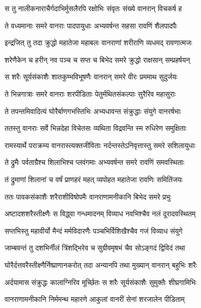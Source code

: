 \twolineshloka
{स तु नालीकनाराचैर्गदाभिर्मुसलैरपि}
{रक्षोभिः संवृतः संख्ये वानरान् विचकर्ष ह} %

\twolineshloka
{ते वध्यमानाः समरे वानराः पादपायुधाः}
{अभ्यवर्षन्त सहसा रावणिं शैलपादपैः} %

\twolineshloka
{इन्द्रजित् तु तदा क्रुद्धो महातेजा महाबलः}
{वानराणां शरीराणि व्यधमद् रावणात्मजः} %

\twolineshloka
{शरेणैकेन च हरीन् नव पञ्च च सप्त च}
{बिभेद समरे क्रुद्धो राक्षसान् सम्प्रहर्षयन्} %

\twolineshloka
{स शरैः सूर्यसंकाशैः शातकुम्भविभूषणैः}
{वानरान् समरे वीरः प्रममाथ सुदुर्जयः} %

\twolineshloka
{ते भिन्नगात्राः समरे वानराः शरपीडिताः}
{पेतुर्मथितसंकल्पाः सुरैरिव महासुराः} %

\twolineshloka
{ते तपन्तमिवादित्यं घोरैर्बाणगभस्तिभिः}
{अभ्यधावन्त संक्रुद्धाः संयुगे वानरर्षभाः} %

\twolineshloka
{ततस्तु वानराः सर्वे भिन्नदेहा विचेतसः}
{व्यथिता विद्रवन्ति स्म रुधिरेण समुक्षिताः} %

\twolineshloka
{रामस्यार्थे पराक्रम्य वानरास्त्यक्तजीविताः}
{नर्दन्तस्तेऽनिवृत्तास्तु समरे सशिलायुधाः} %

\twolineshloka
{ते द्रुमैः पर्वताग्रैश्च शिलाभिश्च प्लवंगमाः}
{अभ्यवर्षन्त समरे रावणिं समवस्थिताः} %

\twolineshloka
{तं द्रुमाणां शिलानां च वर्षं प्राणहरं महत्}
{व्यपोहत महातेजा रावणिः समितिंजयः} %

\twolineshloka
{ततः पावकसंकाशैः शरैराशीविषोपमैः}
{वानराणामनीकानि बिभेद समरे प्रभुः} %

\twolineshloka
{अष्टादशशरैस्तीक्ष्णैः स विद्ध्वा गन्धमादनम्}
{विव्याध नवभिश्चैव नलं दूरादवस्थितम्} %

\twolineshloka
{सप्तभिस्तु महावीर्यो मैन्दं मर्मविदारणैः}
{पञ्चभिर्विशिखैश्चैव गजं विव्याध संयुगे} %

\twolineshloka
{जाम्बवन्तं तु दशभिर्नीलं त्रिंशद्भिरेव च}
{सुग्रीवमृषभं चैव सोऽङ्गदं द्विविदं तथा} %

\twolineshloka
{घोरैर्दत्तवरैस्तीक्ष्णैर्निष्प्राणानकरोत् तदा}
{अन्यानपि तथा मुख्यान् वानरान् बहुभिः शरैः} %

\twolineshloka
{अर्दयामास संक्रुद्धः कालाग्निरिव मूर्च्छितः}
{स शरैः सूर्यसंकाशैः सुमुक्तैः शीघ्रगामिभिः} %

\twolineshloka
{वानराणामनीकानि निर्ममन्थ महारणे}
{आकुलां वानरीं सेनां शरजालेन पीडिताम्} %

